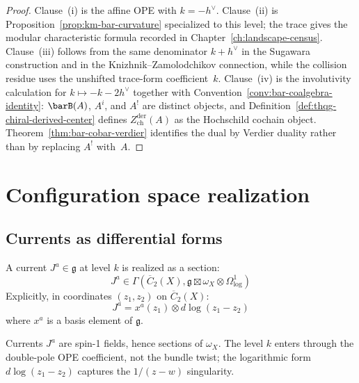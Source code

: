 \begin{proof}
Clause~(i) is the affine OPE with $k=-h^\vee$.  Clause~(ii) is
Proposition~\ref{prop:km-bar-curvature} specialized to this level;
the trace gives the modular characteristic formula recorded in
Chapter~\ref{ch:landscape-census}.  Clause~(iii) follows from the
same denominator $k+h^\vee$ in the Sugawara construction and in the
Knizhnik--Zamolodchikov connection, while the collision residue uses
the unshifted trace-form coefficient~$k$.  Clause~(iv) is the
involutivity calculation for $k\mapsto -k-2h^\vee$ together with
Convention~\ref{conv:bar-coalgebra-identity}: $\barB(A)$, $A^i$,
and $A^!$ are distinct objects, and
Definition~\ref{def:thqg-chiral-derived-center} defines
$Z^{\mathrm{der}}_{\mathrm{ch}}(A)$ as the Hochschild cochain
object.  Theorem~\ref{thm:bar-cobar-verdier} identifies the dual by
Verdier duality rather than by replacing $A^!$ with~$A$.
\end{proof}

\section{Configuration space realization}

\subsection{Currents as differential forms}

\begin{construction}
A current $J^a \in \mathfrak{g}$ at level $k$ is realized as a section:
\begin{equation}
J^a \in \Gamma(\overline{C}_2(X), \mathfrak{g} \boxtimes \omega_X \otimes \Omega^1_{\log})
\end{equation}
Explicitly, in coordinates $(z_1, z_2)$ on $\overline{C}_2(X)$:
\begin{equation}
J^a = x^a(z_1) \otimes d\log(z_1-z_2)
\end{equation}
where $x^a$ is a basis element of $\mathfrak{g}$.
\end{construction}

\begin{remark}
Currents $J^a$ are spin-1 fields, hence sections of $\omega_X$. The level $k$ enters through the double-pole OPE coefficient, not the bundle twist; the logarithmic form $d\log(z_1-z_2)$ captures the $1/(z-w)$ singularity.
\end{remark}


